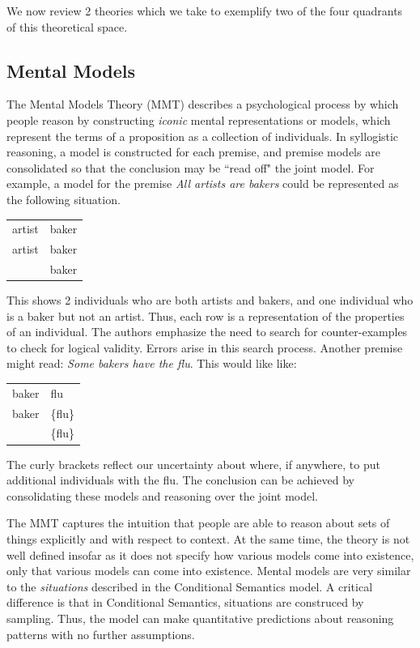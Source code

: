 \documentclass[10pt,letterpaper]{article}
\begin{document}
We now review 2 theories which we take to exemplify two of the four quadrants of this theoretical space. 

\subsection{Mental Models}
 The Mental Models Theory (MMT) describes a psychological process by which people reason by constructing {\em iconic} mental representations or models, which represent the terms of a proposition as a collection of individuals. In syllogistic reasoning, a model is constructed for each premise, and premise models are consolidated so that the conclusion may be ``read off" the joint model. For example, a model for the premise  \emph{All artists are bakers} could be represented as the following situation.

\begin{tabular}{l l}
artist & baker\\
artist & baker\\
 & baker\\
\end{tabular}

This shows 2 individuals who are both artists and bakers, and one individual who is a baker but not an artist. Thus, each row is a representation of the properties of an individual. The authors emphasize the need to search for counter-examples to check for logical validity. Errors arise in this search process. Another premise might read: \emph{Some bakers have the flu}. This would like like:

\begin{tabular}{l l}
baker & flu\\
baker & \{flu\}\\
 & \{flu\}\\
\end{tabular}

The curly brackets reflect our uncertainty about where, if anywhere, to put additional individuals with the flu. The conclusion can be achieved by consolidating these models and reasoning over the joint model.

The MMT captures the intuition that people are able to reason about sets of things explicitly and with respect to context. At the same time, the theory is not well defined insofar as it does not specify how various models come into existence, only that various models can come into existence. Mental models are very similar to the \emph{situations} described in the Conditional Semantics model. A critical difference is that in Conditional Semantics, situations are construced by sampling. Thus, the model can make quantitative predictions about reasoning patterns with no further assumptions. 
\end{document}
